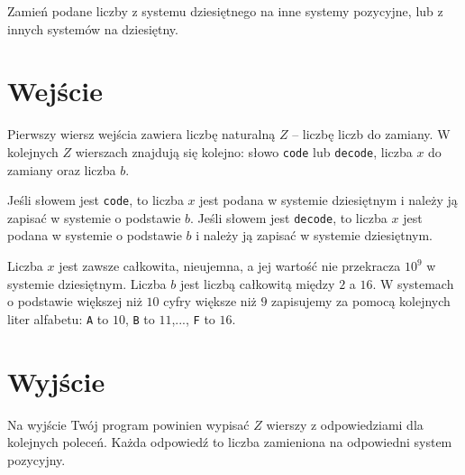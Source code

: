 \documentclass{spiral-kurs}
\begin{document}
  \makeheader

  Zamień podane liczby z systemu dziesiętnego na inne systemy pozycyjne, lub z innych systemów na dziesiętny.
      
  \section{Wejście}
Pierwszy wiersz wejścia zawiera liczbę naturalną $Z$ -- liczbę liczb do zamiany. W kolejnych $Z$ wierszach znajdują się kolejno: słowo \texttt{code} lub \texttt{decode}, liczba $x$ do zamiany oraz liczba $b$.

Jeśli słowem jest \texttt{code}, to liczba $x$ jest podana w systemie dziesiętnym i należy ją zapisać w systemie o podstawie $b$.
Jeśli słowem jest \texttt{decode}, to liczba $x$ jest podana w systemie o podstawie $b$ i należy ją zapisać w systemie dziesiętnym.

Liczba $x$ jest zawsze całkowita, nieujemna, a jej wartość nie przekracza $10^9$ w systemie dziesiętnym. Liczba $b$ jest liczbą całkowitą między $2$ a $16$. W systemach o podstawie większej niż $10$ cyfry większe niż $9$ zapisujemy za pomocą kolejnych liter alfabetu: \texttt{A} to $10$, \texttt{B} to $11$,..., \texttt{F} to $16$.

  \section{Wyjście}
Na wyjście Twój program powinien wypisać $Z$ wierszy z odpowiedziami dla kolejnych poleceń. Każda odpowiedź to liczba zamieniona na odpowiedni system pozycyjny.

  
\end{document}
